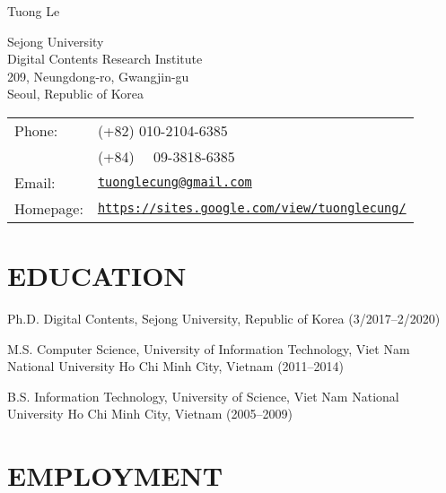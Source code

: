 \documentclass[letterpaper]{article}
\def\name{Tuong Le}
\renewenvironment{itemize}{
  \begin{list}{}{
    \setlength{\leftmargin}{1.5em}
  }
}{
  \end{list}
}
\begin{document}
{\huge \name}


\vspace{0.25in}

\begin{minipage}{0.45\linewidth}
  Sejong University \\
  Digital Contents Research Institute \\
  209, Neungdong-ro, Gwangjin-gu \\
  Seoul, Republic of Korea
\end{minipage}
\begin{minipage}{0.45\linewidth}
  \begin{tabular}{ll}
    Phone: & (+82) 010-2104-6385 \\
    	   & (+84) ~~09-3818-6385 \\
    Email: & \href{mailto:tuonglecung@gmail.com}{\tt tuonglecung@gmail.com} \\
    Homepage: & \href{https://sites.google.com/view/tuonglecung/}{\tt https://sites.google.com/view/tuonglecung/} \\
  \end{tabular}
\end{minipage}


\section*{EDUCATION}

\begin{itemize}

  \item Ph.D. Digital Contents, Sejong University, Republic of Korea (3/2017--2/2020)

  \item M.S. Computer Science, University of Information Technology, Viet Nam National University Ho Chi Minh City, Vietnam (2011--2014)
  
  \item B.S. Information Technology, University of Science, Viet Nam National University Ho Chi Minh City, Vietnam (2005--2009)

\end{itemize}


\section*{EMPLOYMENT}
\end{document}
